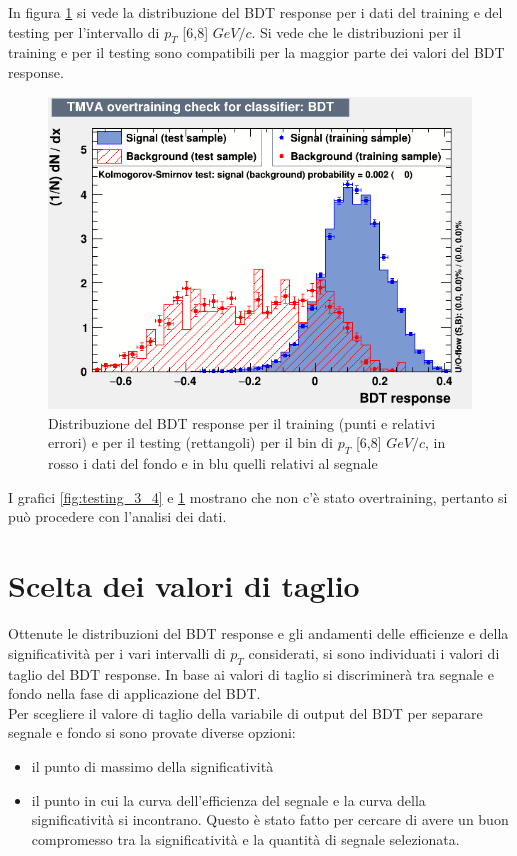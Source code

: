     In figura \ref{fig:testing_6_8} si vede la distribuzione del BDT response per i dati del training e del testing per l'intervallo di $p_T$ [6,8] $GeV/c$. Si vede che le distribuzioni per il training e per il testing sono compatibili per la maggior parte dei valori del BDT response. 
 
    \begin{figure}[htbp] 
        \centering
        \includegraphics[width=0.7\linewidth]{training&testing/overtraining_6_8.png}
        \caption{Distribuzione del BDT response per il training (punti e relativi errori) e per il testing (rettangoli) per il bin di $p_T$ [6,8] $GeV/c$, in rosso i dati del fondo e in blu quelli relativi al segnale}
        \label{fig:testing_6_8}
    \end{figure}
 
    I grafici \ref{fig:testing_3_4} e \ref{fig:testing_6_8} mostrano che non c'è stato overtraining, pertanto si può procedere con l'analisi dei dati.




\section{Scelta dei valori di taglio}

Ottenute le distribuzioni del BDT response e gli andamenti delle efficienze e della significatività per i vari intervalli di $p_T$ considerati, si sono individuati i valori di taglio del BDT response. In base ai valori di taglio si discriminerà tra segnale e fondo nella fase di applicazione del BDT. 
\\Per scegliere il valore di taglio della variabile di output del BDT per separare segnale e fondo si sono provate diverse opzioni:
    \begin{itemize}
    \item il punto di massimo della significatività
    \item il punto in cui la curva dell'efficienza del segnale e la curva della significatività si incontrano. Questo è stato fatto per cercare di avere un buon compromesso tra la significatività e la quantità di segnale selezionata. 
    \end{itemize}
    
